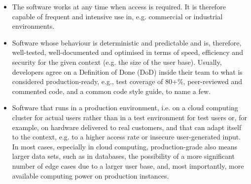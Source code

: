 \begin{itemize}
  \item The software works at any time when access is required. It is therefore capable of frequent and intensive use in, e.g. commercial or industrial environments.
  \item Software whose behaviour is deterministic and predictable and is, therefore, well-tested, well-documented and optimised in terms of speed, efficiency and security for the given context (e.g. the size of the user base). Usually, developers agree on a Definition of Done (DoD) inside their team to what is considered production-ready, e.g., test coverage of 80+\%, peer-reviewed and commented code, and a common code style guide, to name a few.
  \item Software that runs in a production environment, i.e. on a cloud computing cluster for actual users rather than in a test environment for test users or, for example, on hardware delivered to real customers, and that can adapt itself to the context, e.g. to a higher access rate or insecure user-generated input. In most cases, especially in cloud computing, production-grade also means larger data sets, such as in databases, the possibility of a more significant number of edge cases due to a larger user base, and, most importantly, more available computing power on production instances.
\end{itemize}

